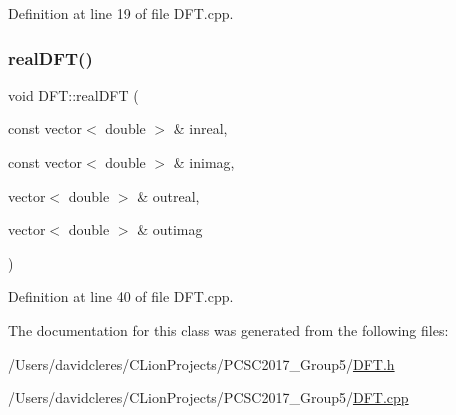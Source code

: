 Definition at line 19 of file D\+F\+T.\+cpp.

\mbox{\label{class_d_f_t_a92567785c575cc75dc6600bcfc6acbea}} 
\subsubsection{\texorpdfstring{real\+D\+F\+T()}{realDFT()}}
{\footnotesize\ttfamily void D\+F\+T\+::real\+D\+FT (\begin{DoxyParamCaption}\item[{const vector$<$ double $>$ \&}]{inreal,  }\item[{const vector$<$ double $>$ \&}]{inimag,  }\item[{vector$<$ double $>$ \&}]{outreal,  }\item[{vector$<$ double $>$ \&}]{outimag }\end{DoxyParamCaption})}



Definition at line 40 of file D\+F\+T.\+cpp.



The documentation for this class was generated from the following files\+:\begin{DoxyCompactItemize}
\item 
/\+Users/davidcleres/\+C\+Lion\+Projects/\+P\+C\+S\+C2017\+\_\+\+Group5/\mbox{\hyperlink{_d_f_t_8h}{D\+F\+T.\+h}}\item 
/\+Users/davidcleres/\+C\+Lion\+Projects/\+P\+C\+S\+C2017\+\_\+\+Group5/\mbox{\hyperlink{_d_f_t_8cpp}{D\+F\+T.\+cpp}}\end{DoxyCompactItemize}
